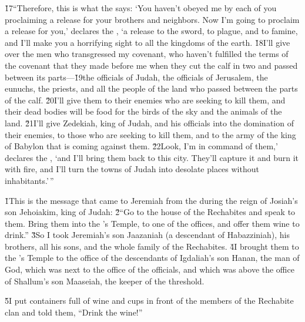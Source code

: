 \v{17}``Therefore, this is what the  says: `You haven't obeyed me by each of you proclaiming a release for your brothers and neighbors. Now I'm going to proclaim a release for you,' declares the , `a release to the sword, to plague, and to famine, and I'll make you a horrifying sight to all the kingdoms of the earth. \v{18}I'll give over the men who transgressed my covenant, who haven't fulfilled the terms of the covenant that they made before me when they cut the calf in two and passed between its parts---\v{19}the officials of Judah, the officials of Jerusalem, the eunuchs, the priests, and all the people of the land who passed between the parts of the calf. \v{20}I'll give them to their enemies who are seeking to kill them, and their dead bodies will be food for the birds of the sky and the animals of the land. \v{21}I'll give Zedekiah, king of Judah, and his officials into the domination of their enemies, to those who are seeking to kill them, and to the army of the king of Babylon that is coming against them. \v{22}Look, I'm in command of them,' declares the , `and I'll bring them back to this city. They'll capture it and burn it with fire, and I'll turn the towns of Judah into desolate places without inhabitants.'\,''

\v{1}This is the message that came to Jeremiah from the  during the reign of Josiah's son Jehoiakim, king of Judah: \v{2}``Go to the house of the Rechabites and speak to them. Bring them into the 's Temple, to one of the offices, and offer them wine to drink.'' \v{3}So I took Jeremiah's son Jaazaniah (a descendant of Habazziniah), his brothers, all his sons, and the whole family of the Rechabites. \v{4}I brought them to the 's Temple to the office of the descendants of Igdaliah's son Hanan, the man of God, which was next to the office of the officials, and which was above the office of Shallum's son Maaseiah, the keeper of the threshold.

\v{5}I put containers full of wine and cups in front of the members of the Rechabite clan and told them, ``Drink the wine!''

